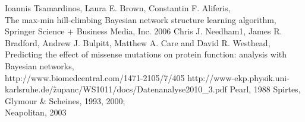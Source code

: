 

\begin{thebibliography}{56}

Ioannis Tsamardinos, Laura E. Brown, Constantin F. Aliferis,\\
The max-min hill-climbing Bayesian network structure learning algorithm,\\
Springer Science + Business Media,
Inc. 2006
Chris J. Needham1, James R. Bradford, Andrew J. Bulpitt, Matthew A. Care and David R. Westhead,\\
Predicting the effect of missense mutations on protein function: analysis with Bayesian networks,\\
http://www.biomedcentral.com/1471-2105/7/405
http://www-ekp.physik.uni-karlsruhe.de/\~zupanc/WS1011/docs/Datenanalyse2010\_3.pdf
Pearl,
1988
Spirtes, Glymour \& Scheines,
1993, 2000; \\
Neapolitan,
2003

\end{thebibliography}

